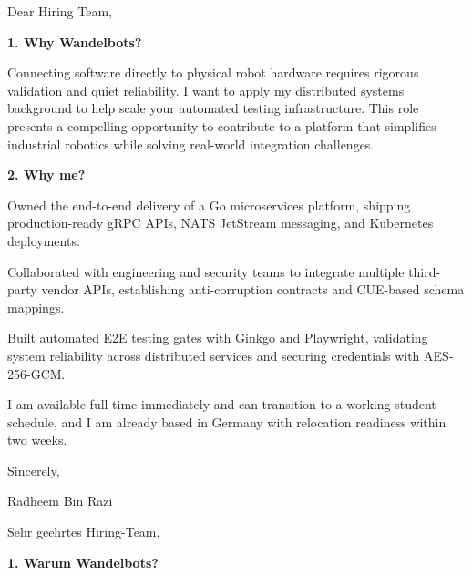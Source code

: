 \documentclass[11pt,a4paper]{coverletter}
\begin{document}

\opening{Dear Hiring Team,}

\vspace{8pt}\noindent\textbf{1. Why Wandelbots?}\par\vspace{3pt}

Connecting software directly to physical robot hardware requires rigorous validation and quiet reliability. I want to apply my distributed systems background to help scale your automated testing infrastructure. This role presents a compelling opportunity to contribute to a platform that simplifies industrial robotics while solving real-world integration challenges.

\vspace{8pt}\noindent\textbf{2. Why me?}\par\vspace{3pt}

\bullets

  \item Owned the end-to-end delivery of a Go microservices platform, shipping production-ready gRPC APIs, NATS JetStream messaging, and Kubernetes deployments.

  \item Collaborated with engineering and security teams to integrate multiple third-party vendor APIs, establishing anti-corruption contracts and CUE-based schema mappings.

  \item Built automated E2E testing gates with Ginkgo and Playwright, validating system reliability across distributed services and securing credentials with AES-256-GCM.

\bulletsend

I am available full-time immediately and can transition to a working-student schedule, and I am already based in Germany with relocation readiness within two weeks.

\closing{Sincerely,}{Radheem Bin Razi}

\clearpage
{}


\opening{Sehr geehrtes Hiring-Team,}

\vspace{8pt}\noindent\textbf{1. Warum Wandelbots?}\par\vspace{3pt}
\end{document}
